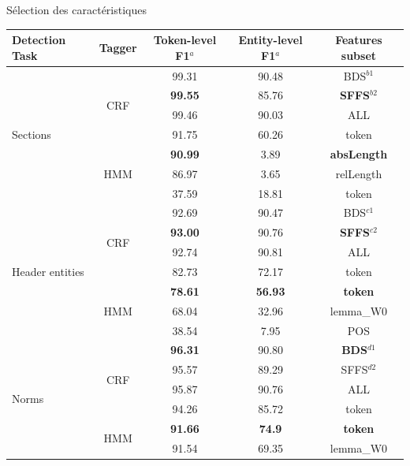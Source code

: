 \documentclass[newPxFont,pagenumber]{beamer}
\begin{document}
\begin{frame}{Sélection des caractéristiques}
\tiny
\begin{tabular}{l|c|ccc}
\toprule
Detection Task & Tagger & {Token-level F1$^a$} & {Entity-level F1$^a$}& Features subset \\ 
\midrule
\multirow{7}{*}{Sections} 		& \multirow{4}{*}{CRF} & 99.31 & 90.48 & BDS$^{b1}$  \\
  				&  & \textbf{99.55} & 85.76 & \textbf{SFFS}$^{b2}$ \\
                &  & 99.46 & 90.03 & ALL \\
                &  & 91.75 & 60.26 & token \\  \cline{2-5}
                 & \multirow{3}{*}{HMM} & \textbf{90.99} & 3.89 & \textbf{absLength} \\ 
 & & 86.97 & 3.65 & relLength \\   
  &  & 37.59 & 18.81 & token \\ \hline
\multirow{7}{*}{Header entities}	& \multirow{4}{*}{CRF} & 92.69 & 90.47 & BDS$^{c1}$  \\
				&  & \textbf{93.00} & 90.76 & \textbf{SFFS}$^{c2}$  \\ 
                &  & 92.74 & 90.81 & ALL \\
                &  & 82.73 & 72.17 & token \\ \cline{2-5}
                  &  \multirow{3}{*}{HMM}  & \textbf{78.61} & \textbf{56.93} &  \textbf{token} \\ 
  &    & 68.04 & 32.96 &  lemma\_W0 \\ 
  &    & 38.54 & 7.95 &  POS \\ \hline
\multirow{6}{*}{Norms} 			& \multirow{4}{*}{CRF} & \textbf{96.31} & 90.80 & \textbf{BDS}$^{d1}$ \\ 
				&  & 95.57 & 89.29 & SFFS$^{d2}$ \\ 
                &  & 95.87 & 90.76 & ALL \\
                &  & 94.26 & 85.72 & token \\ \cline{2-5}
                 &  \multirow{2}{*}{HMM} & \textbf{91.66} & \textbf{74.9} &  \textbf{token} \\ 
  &   & 91.54 & 69.35 &  lemma\_W0 \\ 
\bottomrule
\end{tabular}
\end{frame}
\end{document}
